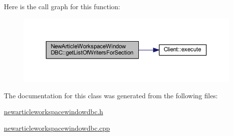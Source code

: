 Here is the call graph for this function\+:
\nopagebreak
\begin{figure}[H]
\begin{center}
\leavevmode
\includegraphics[width=350pt]{class_new_article_workspace_window_d_b_c_aa0ac3e7f4adc1ea64885d6b51f73c9e7_cgraph}
\end{center}
\end{figure}




The documentation for this class was generated from the following files\+:\begin{DoxyCompactItemize}
\item 
\hyperlink{newarticleworkspacewindowdbc_8h}{newarticleworkspacewindowdbc.\+h}\item 
\hyperlink{newarticleworkspacewindowdbc_8cpp}{newarticleworkspacewindowdbc.\+cpp}\end{DoxyCompactItemize}
